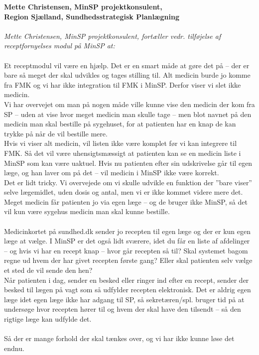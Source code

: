 \textbf{Mette Christensen, MinSP projektkonsulent, \\
	Region Sjælland, Sundhedsstrategisk Planlægning}\\\\
\textit{Mette Christensen, MinSP projektkonsulent, fortæller vedr. tilføjelse af receptfornyelses modul på MinSP at:}\\\\
Et receptmodul vil være en hjælp. Det er en smart måde at gøre det på – der er bare så meget der skal udvikles og tages stilling til. Alt medicin burde jo komme fra FMK og vi har ikke integration til FMK i MinSP. Derfor viser vi slet ikke medicin.
\\
Vi har overvejet om man på nogen måde ville kunne vise den medicin der kom fra SP – uden at vise hvor meget medicin man skulle tage – men blot navnet på den medicin man skal bestille på sygehuset, for at patienten har en knap de kan trykke på når de vil bestille mere.
\\
Hvis vi viser alt medicin, vil listen ikke være komplet før vi kan integrere til FMK. Så det vil være uhensigtsmæssigt at patienten kan se en medicin liste i MinSP som kan være uaktuel. Hvis nu patienten efter sin udskrivelse går til egen læge, og han laver om på det – vil medicin i MinSP ikke være korrekt.
\\
Det er lidt tricky. Vi overvejede om vi skulle udvikle en funktion der ”bare viser” selve lægemidlet, uden dosis og antal, men vi er ikke kommet videre mere det.  
\\
Meget medicin får patienten jo via egen læge – og de bruger ikke MinSP, så det vil kun være sygehus medicin man skal kunne bestille.
\\\\
Medicinkortet på sundhed.dk sender jo recepten til egen læge og der er kun egen læge at vælge. I MinSP er det også lidt sværere, idet du får en liste af afdelinger – og hvis vi har en recept knap – hvor går recepten så til? Skal systemet bagom regne ud hvem der har givet recepten første gang? Eller skal patienten selv vælge et sted de vil sende den hen?\\
Når patienten i dag, sender en besked eller ringer ind efter en recept, sender der besked til lægen på vagt som så udfylder recepten elektronisk. Det er aldrig egen læge idet egen læge ikke har adgang til SP, så sekretæren/spl. bruger tid på at undersøge hvor recepten hører til og hvem der skal have den tilsendt – så den rigtige læge kan udfylde det.\\\\
Så der er mange forhold der skal tænkes over, og vi har ikke kunne løse det endnu.

